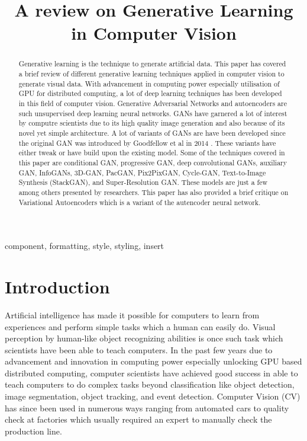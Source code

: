 \documentclass[conference]{IEEEtran}
\begin{document}
\title{A review on Generative Learning in Computer Vision}

\author{
}

\maketitle

\begin{abstract}
Generative learning is the technique to generate artificial data. This paper has covered a brief review of different generative learning techniques applied in computer vision to generate visual data. With advancement in computing power especially utilisation of GPU for distributed computing, a lot of deep learning techniques has been developed in this field of computer vision. Generative Adversarial Networks and autoencoders are such unsupervised deep learning neural networks. GANs have garnered a lot of interest by computre scientists due to its high quality image generation and also because of its novel yet simple architecture. A lot of variants of GANs are have been developed since the original GAN was introduced by Goodfellow et al in 2014 \cite{b1}. These variants have either tweak or have build upon the existing model. Some of the techniques covered in this paper are conditional GAN, progressive GAN, deep convolutional GANs, auxiliary GAN, InfoGANs, 3D-GAN, PacGAN, Pix2PixGAN, Cycle-GAN, Text-to-Image Synthesis (StackGAN), and Super-Resolution GAN. These models are just a few among others presented by researchers. This paper has also provided a brief critique on Variational Autoencoders which is a variant of the autencoder neural network. 
\end{abstract}

\begin{IEEEkeywords}
component, formatting, style, styling, insert
\end{IEEEkeywords}

\section{Introduction}
Artificial intelligence has made it possible for computers to learn from experiences and perform simple tasks which a human can easily do. Visual perception by human-like object recognizing abilities is once such task which scientists have been able to teach computers. In the past few years due to advancement and innovation in computing power especially unlocking GPU based distributed computing, computer scientists have achieved good success in able to teach computers to do complex tasks beyond classification like object detection, image segmentation, object tracking, and event detection. Computer Vision (CV) has since been used in numerous ways ranging from automated cars to quality check at factories which usually required an expert to manually check the production line.
\end{document}
